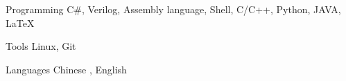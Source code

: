 


\begin{cvskills}


\cvskill
{Programming} %
{C\#, Verilog, Assembly language, Shell, C/C++, Python, JAVA, \LaTeX} %


\cvskill
{Tools} %
{Linux, Git} %


\cvskill
{Languages} %
{Chinese , English} %


\end{cvskills}